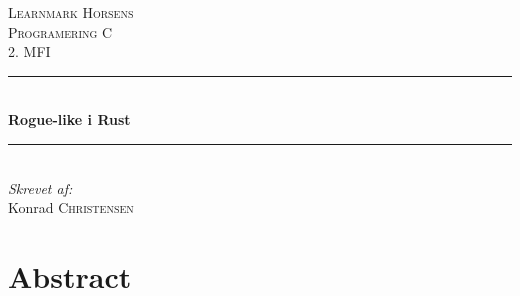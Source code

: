 \documentclass[12pt]{article}
\begin{document}
\begin{titlepage}

	\newcommand{\HRule}{\rule{\linewidth}{0.5mm}}

	\center


	\textsc{\LARGE Learnmark Horsens}\\[1.5cm] %
	\textsc{\Large Programering C}\\[0.5cm] %
	\textsc{\large 2. MFI}\\[0.5cm] %


	\HRule \\[0.4cm]
	{ \huge \bfseries Rogue-like i Rust}\\[0.4cm]
	\HRule \\[1.5cm]


	\Large \emph{Skrevet af:}\\
	Konrad \textsc{Christensen}\\[3cm]

	\vfill

\end{titlepage}

\pagebreak


\tableofcontents

\vfill

\pagebreak


\section{Abstract}
\end{document}
